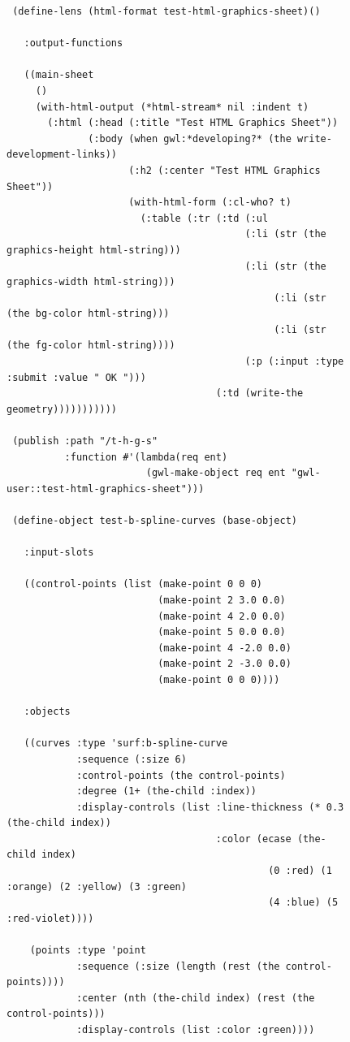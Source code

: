 \documentclass [11pt]{book}
\begin{document}
\begin{itemize}
\begin{figure}
\begin{lrbox}{\boxedverb}
\begin{minipage}{\linewidth}
{\begin{verbatim}
 (define-lens (html-format test-html-graphics-sheet)()
   
   :output-functions

   ((main-sheet
     ()
     (with-html-output (*html-stream* nil :indent t)
       (:html (:head (:title "Test HTML Graphics Sheet"))
              (:body (when gwl:*developing?* (the write-development-links))
                     (:h2 (:center "Test HTML Graphics Sheet"))
                     (with-html-form (:cl-who? t)
                       (:table (:tr (:td (:ul 
                                         (:li (str (the graphics-height html-string)))
                                         (:li (str (the graphics-width html-string)))
                                              (:li (str (the bg-color html-string)))
                                              (:li (str (the fg-color html-string))))
                                         (:p (:input :type :submit :value " OK ")))
                                    (:td (write-the geometry)))))))))))

 (publish :path "/t-h-g-s"
          :function #'(lambda(req ent)
                        (gwl-make-object req ent "gwl-user::test-html-graphics-sheet")))

 (define-object test-b-spline-curves (base-object)

   :input-slots

   ((control-points (list (make-point 0 0 0)
                          (make-point 2 3.0 0.0) 
                          (make-point 4 2.0 0.0) 
                          (make-point 5 0.0 0.0) 
                          (make-point 4 -2.0 0.0) 
                          (make-point 2 -3.0 0.0) 
                          (make-point 0 0 0))))
  
   :objects

   ((curves :type 'surf:b-spline-curve
            :sequence (:size 6)
            :control-points (the control-points)
            :degree (1+ (the-child :index))
            :display-controls (list :line-thickness (* 0.3 (the-child index))
                                    :color (ecase (the-child index)
                                             (0 :red) (1 :orange) (2 :yellow) (3 :green)
                                             (4 :blue) (5 :red-violet))))

    (points :type 'point 
            :sequence (:size (length (rest (the control-points))))
            :center (nth (the-child index) (rest (the control-points)))
            :display-controls (list :color :green))))


\end{verbatim}}
\end{minipage}
\end{lrbox}
\end{figure}
\end{itemize}
\end{document}
